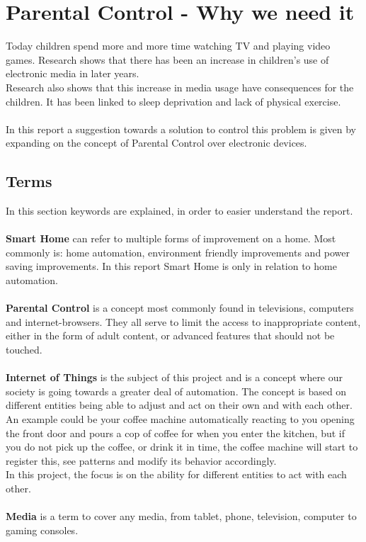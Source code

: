 \chapter{Parental Control - Why we need it} 
Today children spend more and more time watching TV and playing video games. Research shows that there has been an increase in children's use of electronic media in later years. \citep{sundhedsstyrelsen}\\
Research also shows that this increase in media usage have consequences for the children. It has been linked to sleep deprivation\citep{bmcPublicHealth} and lack of physical exercise\citep{bmcPublicHealth}.\\
\\
In this report a suggestion towards a solution to control this problem is given by expanding on the concept of Parental Control over electronic devices.

\section{Terms}
In this section keywords are explained, in order to easier understand the report.\\
\\
\textbf{Smart Home} can refer to multiple forms of improvement on a home. Most commonly is: home automation, environment friendly improvements and power saving improvements. In this report Smart Home is only in relation to home automation.\\
\\
\textbf{Parental Control} is a concept most commonly found in televisions, computers and internet-browsers. They all serve to limit the access to inappropriate content, either in the form of adult content, or advanced features that should not be touched.\\
\\
\textbf{Internet of Things} is the subject of this project and is a concept where our society is going towards a greater deal of automation. The concept is based on different entities being able to adjust and act on their own and with each other. An example could be your coffee machine automatically reacting to you opening the front door and pours a cop of coffee for when you enter the kitchen, but if you do not pick up the coffee, or drink it in time, the coffee machine will start to register this, see patterns and modify its behavior accordingly.\citep{internetOfThings}\\
In this project, the focus is on the ability for different entities to act with each other. \\
\\
\textbf{Media} is a term to cover any media, from tablet, phone, television, computer to gaming consoles.

